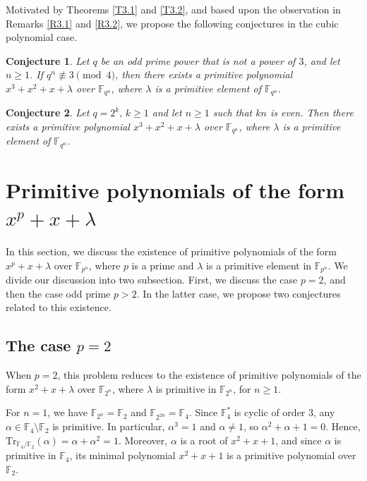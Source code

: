 \documentclass[preprint,12pt]{elsarticle}
\newtheorem{con}{Conjecture}[section]
\begin{document}
    Motivated by Theorems \ref{T3.1} and \ref{T3.2}, and based upon the observation in Remarks \ref{R3.1} and \ref{R3.2}, we propose the following conjectures in the cubic polynomial case.

    \begin{con}\label{Con3.1}
        Let $q$ be an odd prime power that is not a power of $3$, and let $n\geq 1$. If $q^n\not\equiv 3\pmod{4}$, then there exists a primitive polynomial $x^3+x^2+x+\lambda$ over $\mathbb{F}_{q^n}$, where $\lambda$ is a primitive element of $\mathbb{F}_{q^n}$.
    \end{con}

    \begin{con}\label{Con3.2}
        Let $q=2^k,\, k\geq 1$ and let $n\geq 1$ such that $kn$ is even. Then there exists a primitive polynomial $x^3+x^2+x+\lambda$ over $\mathbb{F}_{q^n}$, where $\lambda$ is a primitive element of $\mathbb{F}_{q^n}$.
    \end{con} 
    
\section{Primitive polynomials of the form $x^p+x+\lambda$}\label{S4}
        In this section, we discuss the existence of primitive polynomials of the form $x^p+x+\lambda$ over $\mathbb{F}_{p^n}$, where $p$ is a prime and $\lambda$ is a primitive element in $\mathbb{F}_{p^n}$. We divide our discussion into two subsection. First, we discuss the case $p=2$, and then the case odd prime $p>2$. In the latter case, we propose two conjectures related to this existence.  

    \subsection{The case $p=2$}
        When $p=2$, this problem reduces to the existence of primitive polynomials of the form $x^2+x+\lambda$ over $\mathbb{F}_{2^n}$, where $\lambda$ is primitive in $\mathbb{F}_{2^n}$, for $n\geq 1$. 
        
        For $n=1$, we have $\mathbb{F}_{2^n}=\mathbb{F}_2$ and $\mathbb{F}_{2^{2n}}=\mathbb{F}_4$. Since $\mathbb{F}_4^*$ is cyclic of order $3$, any $\alpha\in\mathbb{F}_4\setminus\mathbb{F}_2$ is primitive. In particular, $\alpha^3=1$ and $\alpha\neq1$, so $\alpha^2+\alpha+1=0.$ Hence, $\mathrm{Tr}_{\mathbb{F}_4/\mathbb{F}_2}(\alpha)=\alpha+\alpha^2=1.$ Moreover, $\alpha$ is a root of $x^2+x+1$, and since $\alpha$ is primitive in $\mathbb{F}_4$, its minimal polynomial $x^2+x+1$ is a primitive polynomial over $\mathbb{F}_2$.
        
\end{document}
